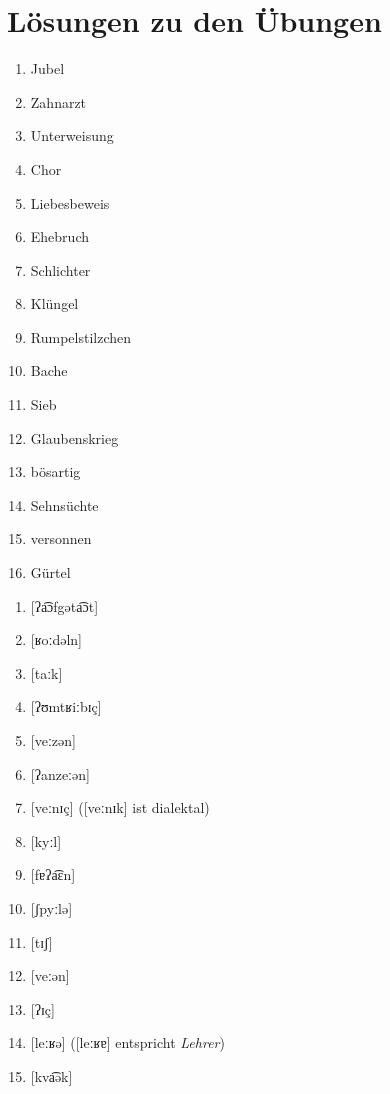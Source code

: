 {}
\chapter*{Lösungen zu den Übungen}
\label{sec:loesungenzudenuebungen}


\label{sol:phonetik01}

\begin{enumerate}
  \item Jubel
  \item Zahnarzt
  \item Unterweisung
  \item Chor
  \item Liebesbeweis
  \item Ehebruch
  \item Schlichter
  \item Klüngel
  \item Rumpelstilzchen
  \item Bache
  \item Sieb
  \item Glaubenskrieg
  \item bösartig
  \item Sehnsüchte
  \item versonnen
  \item Gürtel
\end{enumerate}


\label{sol:phonetik02}

\begin{enumerate}
  \item{[ʔa͡ɔfgəta͡ɔt]}
  \item{[ʁoːdəln]}
  \item{[taːk]}
  \item{[ʔʊmtʁiːbɪç]}
  \item{[veːzən]}
  \item{[ʔanzeːən]}
  \item{[veːnɪç] ([veːnɪk] ist dialektal)}
  \item{[kyːl]}
  \item{[fɐʔa͡ɛn]}
  \item{[ʃpyːlə]}
  \item{[tɪʃ]}
  \item{[veːən]}
  \item{[ʔɪç]}
  \item{[leːʁə] ([leːʁɐ] entspricht \textit{Lehrer})}
  \item{[kva͡ək]}
\end{enumerate}


